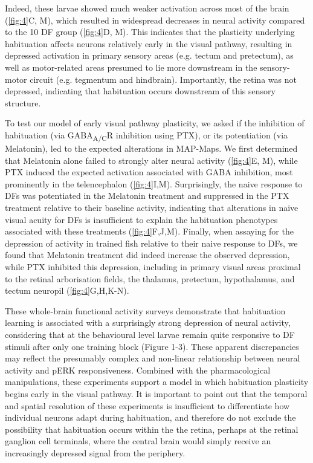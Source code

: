 \documentclass[9pt,lineno]{RandlettLab_elife}
\begin{document}
Indeed, these larvae showed much weaker activation across most of the brain (\autoref{fig:4}C, M), which resulted in widespread decreases in neural activity compared to the 10 DF group (\autoref{fig:4}D, M). This indicates that the plasticity underlying habituation affects neurons relatively early in the visual pathway, resulting in depressed activation in primary sensory areas (e.g. tectum and pretectum), as well as motor-related areas presumed to lie more downstream in the sensory-motor circuit (e.g. tegmentum and hindbrain). Importantly, the retina was not depressed, indicating that habituation occurs downstream of this sensory structure. 

To test our model of early visual pathway plasticity, we asked if the inhibition of habituation (via GABA\textsubscript{A/C}R inhibition using PTX), or its potentiation (via Melatonin), led to the expected alterations in MAP-Maps. We first determined that Melatonin alone failed to strongly alter neural activity (\autoref{fig:4}E, M), while PTX induced the expected activation associated with GABA inhibition, most prominently in the telencephalon (\autoref{fig:4}I,M). Surprisingly, the naive response to DFs was potentiated in the Melatonin treatment and suppressed in the PTX treatment relative to their baseline activity, indicating that alterations in naive visual acuity for DFs is insufficient to explain the habituation phenotypes associated with these treatments (\autoref{fig:4}F,J,M). Finally, when assaying for the depression of activity in trained fish relative to their naive response to DFs, we found that Melatonin treatment did indeed increase the observed depression, while PTX inhibited this depression, including in primary visual areas proximal to the retinal arborisation fields, the thalamus, pretectum, hypothalamus, and tectum neuropil (\autoref{fig:4}G,H,K-N). 

These whole-brain functional activity surveys demonstrate that habituation learning is associated with a surprisingly strong depression of neural activity, considering that at the behavioural level larvae remain quite responsive to DF stimuli after only one training block (Figure 1-3). These apparent discrepancies may reflect the presumably complex and non-linear relationship between neural activity and pERK responsiveness. Combined with the pharmacological manipulations, these experiments support a model in which habituation plasticity begins early in the visual pathway. It is important to point out that the temporal and spatial resolution of these experiments is insufficient to differentiate how individual neurons adapt during habituation, and therefore do not exclude the possibility that habituation occurs within the the retina, perhaps at the retinal ganglion cell terminals, where the central brain would simply receive an increasingly depressed signal from the periphery. 
\end{document}
